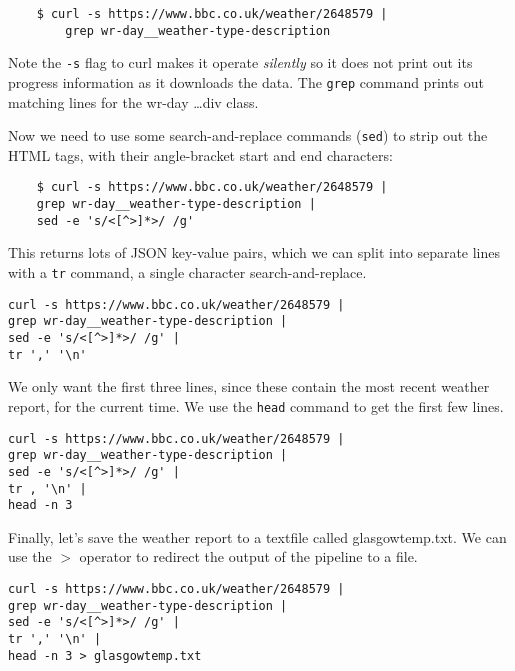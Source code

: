 \documentclass{article}
\begin{document}
\begin{verbatim}
    $ curl -s https://www.bbc.co.uk/weather/2648579 | 
        grep wr-day__weather-type-description 
\end{verbatim}

Note the \texttt{-s} flag to curl makes it operate \textit{silently} so it does not print out its progress information as it downloads the data. The \texttt{grep} command prints out matching lines for the wr-day \ldots div class.

Now we need to use some search-and-replace commands (\texttt{sed}) to strip out the HTML tags, with their angle-bracket start and end characters:

\begin{verbatim}
    $ curl -s https://www.bbc.co.uk/weather/2648579 | 
    grep wr-day__weather-type-description |
    sed -e 's/<[^>]*>/ /g'
\end{verbatim}


This returns lots of JSON key-value pairs, which we can split into separate lines with a \texttt{tr} command, a single character search-and-replace.

\begin{verbatim}
curl -s https://www.bbc.co.uk/weather/2648579 | 
grep wr-day__weather-type-description |  
sed -e 's/<[^>]*>/ /g' | 
tr ',' '\n'
\end{verbatim}

We only want the first three lines, since these contain the most recent weather report, for the current time. We use the \texttt{head} command to get the first few lines.

\begin{verbatim}
curl -s https://www.bbc.co.uk/weather/2648579 | 
grep wr-day__weather-type-description |  
sed -e 's/<[^>]*>/ /g' | 
tr , '\n' | 
head -n 3
\end{verbatim}


Finally, let's save the weather report to a textfile called glasgowtemp.txt. We can use the $>$  operator to redirect the output of the pipeline to a file.

\begin{verbatim}
curl -s https://www.bbc.co.uk/weather/2648579 | 
grep wr-day__weather-type-description |  
sed -e 's/<[^>]*>/ /g' | 
tr ',' '\n' | 
head -n 3 > glasgowtemp.txt
\end{verbatim}
\end{document}
